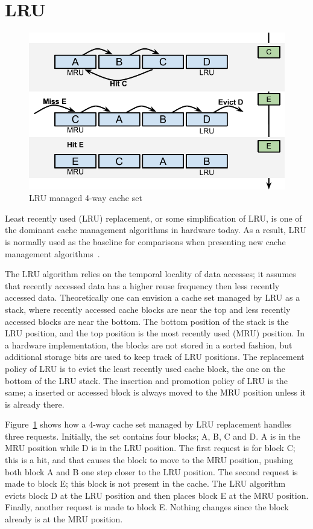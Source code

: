 
\section{LRU}
\label{sec:algorithms:lru}


\begin{figure}[ht]
    \centering
    \includegraphics[width=\textwidth]{figures/algorithms/LRU}
    \caption{LRU managed 4-way cache set}
    \label{fig:background:lru_example}
\end{figure}

Least recently used (LRU) replacement, or some simplification of LRU, is one of the dominant cache management algorithms in hardware today. 
As a result, LRU is normally used as the baseline for comparisons when presenting new cache management algorithms~\cite{Jaleel2010,Qureshi2006,Qureshi2007}.

The LRU algorithm relies on the temporal locality of data accesses; it assumes that recently accessed data has a higher reuse frequency then less recently accessed data.
Theoretically one can envision a cache set managed by LRU as a stack, where recently accessed cache blocks are near the top and less recently accessed blocks are near the bottom.
The bottom position of the stack is the LRU position, and the top position is the most recently used (MRU) position.
In a hardware implementation, the blocks are not stored in a sorted fashion, but additional storage bits are used to keep track of LRU positions.
The replacement policy of LRU is to evict the least recently used cache block, the one on the bottom of the LRU stack.
The insertion and promotion policy of LRU is the same; a inserted or accessed block is always moved to the MRU position unless it is already there.

Figure~\ref{fig:background:lru_example} shows how a 4-way cache set managed by LRU replacement handles three requests. 
Initially, the set contains four blocks; A, B, C and D. 
A is in the MRU position while D is in the LRU position.
The first request is for block C; this is a hit, and that causes the block to move to the MRU position, pushing both block A and B one step closer to the LRU position.
The second request is made to block E; this block is not present in the cache.
The LRU algorithm evicts block D at the LRU position and then places block E at the MRU position.
Finally, another request is made to block E. Nothing changes since the block already is at the MRU position.

